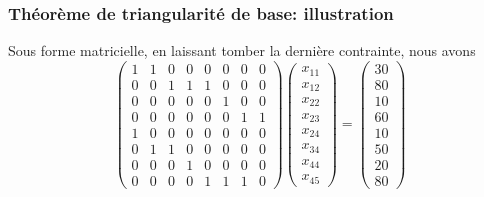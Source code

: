 \documentclass[usepdftitle=false, aspectratio=169]{beamer}
\begin{document}
\begin{frame}
\frametitle{Théorème de triangularité de base: illustration}

Sous forme matricielle, en laissant tomber la dernière contrainte, nous avons
\[
\begin{pmatrix}
 1 & 1 & 0 & 0 & 0 & 0 & 0 & 0 \\
 0 & 0 & 1 & 1 & 1 & 0 & 0 & 0 \\
 0 & 0 & 0 & 0 & 0 & 1 & 0 & 0 \\
 0 & 0 & 0 & 0 & 0 & 0 & 1 & 1 \\
 1 & 0 & 0 & 0 & 0 & 0 & 0 & 0 \\
 0 & 1 & 1 & 0 & 0 & 0 & 0 & 0 \\
 0 & 0 & 0 & 1 & 0 & 0 & 0 & 0 \\
 0 & 0 & 0 & 0 & 1 & 1 & 1 & 0
\end{pmatrix}
\begin{pmatrix}
x_{11} \\
x_{12} \\
x_{22} \\
x_{23} \\
x_{24} \\
x_{34} \\
x_{44} \\
x_{45}
\end{pmatrix}
=
\begin{pmatrix}
30 \\
80 \\
10 \\
60 \\
10 \\
50 \\
20 \\
80
\end{pmatrix}
\]

\end{frame}
\end{document}

